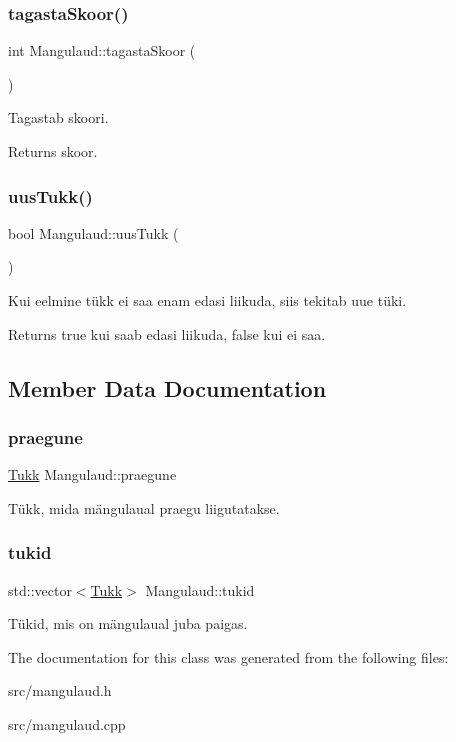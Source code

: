 \subsubsection{\texorpdfstring{tagastaSkoor()}{tagastaSkoor()}}
{\footnotesize\ttfamily int Mangulaud\+::tagasta\+Skoor (\begin{DoxyParamCaption}{ }\end{DoxyParamCaption})}

Tagastab skoori. \begin{DoxyReturn}{Returns}
skoor. 
\end{DoxyReturn}
\mbox{\label{class_mangulaud_a9d6ac3b57461e3258dba146adbd653eb}} 
\subsubsection{\texorpdfstring{uusTukk()}{uusTukk()}}
{\footnotesize\ttfamily bool Mangulaud\+::uus\+Tukk (\begin{DoxyParamCaption}{ }\end{DoxyParamCaption})}

Kui eelmine tükk ei saa enam edasi liikuda, siis tekitab uue tüki. \begin{DoxyReturn}{Returns}
true kui saab edasi liikuda, false kui ei saa. 
\end{DoxyReturn}


\subsection{Member Data Documentation}
\mbox{\label{class_mangulaud_a42c3121190a81047c4d3aba5e0365573}} 
\subsubsection{\texorpdfstring{praegune}{praegune}}
{\footnotesize\ttfamily \mbox{\hyperlink{class_tukk}{Tukk}} Mangulaud\+::praegune}

Tükk, mida mängulaual praegu liigutatakse. \mbox{\label{class_mangulaud_a156a2c25e2adc3f830d3094e3f1693ff}} 
\subsubsection{\texorpdfstring{tukid}{tukid}}
{\footnotesize\ttfamily std\+::vector$<$\mbox{\hyperlink{class_tukk}{Tukk}}$>$ Mangulaud\+::tukid}

Tükid, mis on mängulaual juba paigas. 

The documentation for this class was generated from the following files\+:\begin{DoxyCompactItemize}
\item 
src/mangulaud.\+h\item 
src/mangulaud.\+cpp\end{DoxyCompactItemize}

